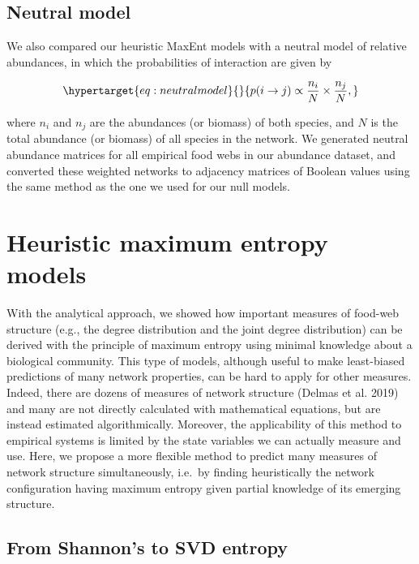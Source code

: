 \documentclass[10pt,oneside]{article}
\begin{document}
\hypertarget{neutral-model}{%
\subsection{Neutral model}\label{neutral-model}}

We also compared our heuristic MaxEnt models with a neutral model of
relative abundances, in which the probabilities of interaction are given
by

\begin{equation}\protect\hypertarget{eq:neutralmodel}{}{p(i \rightarrow j) \propto \frac{n_i}{N} \times \frac{n_j}{N},}\label{eq:neutralmodel}\end{equation}

where \(n_i\) and \(n_j\) are the abundances (or biomass) of both
species, and \(N\) is the total abundance (or biomass) of all species in
the network. We generated neutral abundance matrices for all empirical
food webs in our abundance dataset, and converted these weighted
networks to adjacency matrices of Boolean values using the same method
as the one we used for our null models.

\hypertarget{heuristic-maximum-entropy-models}{%
\section{Heuristic maximum entropy
models}\label{heuristic-maximum-entropy-models}}

With the analytical approach, we showed how important measures of
food-web structure (e.g., the degree distribution and the joint degree
distribution) can be derived with the principle of maximum entropy using
minimal knowledge about a biological community. This type of models,
although useful to make least-biased predictions of many network
properties, can be hard to apply for other measures. Indeed, there are
dozens of measures of network structure (Delmas et al. 2019) and many
are not directly calculated with mathematical equations, but are instead
estimated algorithmically. Moreover, the applicability of this method to
empirical systems is limited by the state variables we can actually
measure and use. Here, we propose a more flexible method to predict many
measures of network structure simultaneously, i.e.~by finding
heuristically the network configuration having maximum entropy given
partial knowledge of its emerging structure.

\hypertarget{from-shannons-to-svd-entropy}{%
\subsection{From Shannon's to SVD
entropy}\label{from-shannons-to-svd-entropy}}
\end{document}
